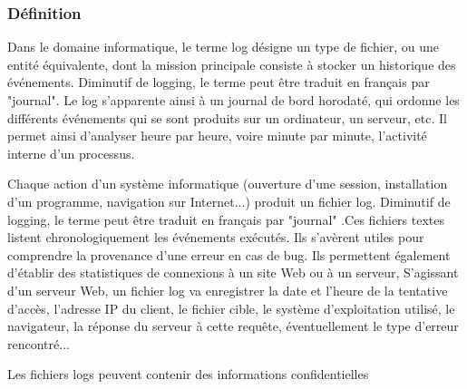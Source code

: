 \subsubsection{Définition}
Dans le domaine informatique, le terme log désigne un type de fichier, ou une entité équivalente, dont la mission principale consiste à stocker un historique des événements. Diminutif de logging, le terme peut être traduit en français par "journal". Le log s'apparente ainsi à un journal de bord horodaté, qui ordonne les différents événements qui se sont produits sur un ordinateur, un serveur, etc. Il permet ainsi d'analyser heure par heure, voire minute par minute, l'activité interne d'un processus.


Chaque action d'un système informatique (ouverture d'une session, installation d'un programme, navigation sur Internet...) produit un fichier log. Diminutif de logging, le terme peut être traduit en français par "journal" .Ces fichiers textes listent chronologiquement les événements exécutés. Ils s'avèrent utiles pour comprendre la provenance d'une erreur en cas de bug.
Ils permettent également d'établir des statistiques de connexions à un site Web ou à un serveur,
S'agissant d'un serveur Web, un fichier log va enregistrer la date et l'heure de la tentative d'accès, l'adresse IP du client, le fichier cible, le système d'exploitation utilisé, le navigateur, la réponse du serveur à cette requête, éventuellement le type d'erreur rencontré...

Les fichiers logs peuvent contenir des informations confidentielles

